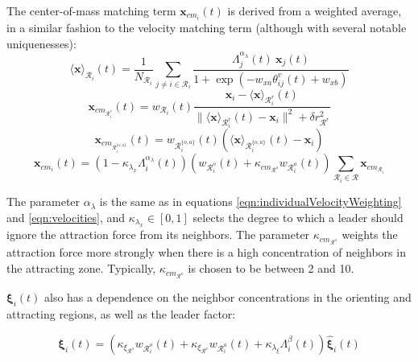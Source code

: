 \documentclass[conference]{IEEEtran}
\begin{document}
The center-of-mass matching term $\mathbf{x}_{cm_i}(t)$ is derived from a weighted average, in a similar fashion to the velocity matching term (although with several notable uniquenesses):
\begin{equation}
    \langle\mathbf{x}\rangle_{\mathcal{R}_i}(t) = \frac{1}{N_{\mathcal{R}_i}}\sum_{j\neq i\in\mathcal{R}_i}\frac{\Lambda_j^{\alpha_\lambda}(t)~\mathbf{x}_j(t)}{1+\exp\left(-w_{xa}\theta^v_{ij}(t)+w_{xb}\right)}
    \label{eqn:individualPositionWeighting}
\end{equation}
\begin{equation}
    \mathbf{x}_{cm_{\mathcal{R}^r_i}}(t) = w_{\mathcal{R}_i}(t)\frac{\mathbf{x}_i-\langle\mathbf{x}\rangle_{\mathcal{R}^r_i}(t)}{\lVert\langle\mathbf{x}\rangle_{\mathcal{R}^r_i}(t)-\mathbf{x}_i\rVert^2+\delta r_{\mathcal{R}^r}^2}
\end{equation}
\begin{equation}
    \mathbf{x}_{cm_{\mathcal{R}^{\{o,a\}}_i}}(t) = w_{\mathcal{R}^{\{o,a\}}_i}(t)\left(\langle\mathbf{x}\rangle_{\mathcal{R}^{\{o,a\}}_i}(t)-\mathbf{x}_i\right)
\end{equation}
\begin{equation}
    \mathbf{x}_{cm_i}(t) = \left(1 - \kappa_{\lambda_x}\Lambda_i^{\alpha_\lambda}(t)\right)\left(w_{\mathcal{R}^o_i}(t)+\kappa_{cm_{\mathcal{R}^a}}w_{\mathcal{R}^a_i}(t)\right)\sum_{\mathcal{R}_i\in\bm{\mathcal{R}}}\mathbf{x}_{cm_{\mathcal{R}_i}}
    \label{eqn:positions}
\end{equation}

The parameter $\alpha_\lambda$ is the same as in equations \ref{eqn:individualVelocityWeighting} and \ref{eqn:velocities}, and $\kappa_{\lambda_x}\in[0,1]$ selects the degree to which a leader should ignore the attraction force from its neighbors.
The parameter $\kappa_{cm_{\mathcal{R}^a}}$ weights the attraction force more strongly when there is a high concentration of neighbors in the attracting zone.
Typically, $\kappa_{cm_{\mathcal{R}^a}}$ is chosen to be between 2 and 10.

$\bm{\xi}_i(t)$ also has a dependence on the neighbor concentrations in the orienting and attracting regions, as well as the leader factor:

\begin{equation}
    \bm{\xi}_i(t) = \left(\kappa_{\xi_{\mathcal{R}^o}}w_{\mathcal{R}^o_i}(t) + \kappa_{\xi_{\mathcal{R}^a}}w_{\mathcal{R}^a_i}(t) + \kappa_{\lambda_\xi}\Lambda^{\beta}_{i}(t)\right)\hat{\bm{\xi}}_i(t)
\end{equation}
\end{document}
